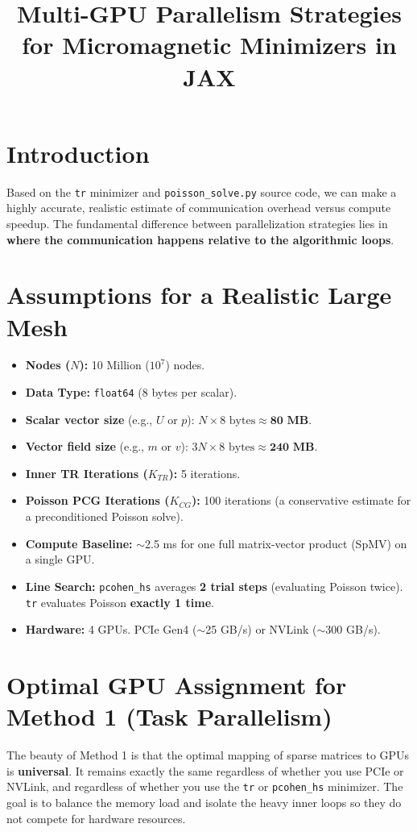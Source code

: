 \documentclass[12pt,a4paper]{article}
\title{Multi-GPU Parallelism Strategies for Micromagnetic Minimizers in JAX}
\author{}
\date{}
\begin{document}
\maketitle

\section{Introduction}
Based on the \texttt{tr} minimizer and \texttt{poisson\_solve.py} source code, we can make a highly accurate, realistic estimate of communication overhead versus compute speedup. The fundamental difference between parallelization strategies lies in \textbf{where the communication happens relative to the algorithmic loops}.

\section{Assumptions for a Realistic Large Mesh}
\begin{itemize}
    \item \textbf{Nodes ($N$):} 10 Million ($10^7$) nodes.
    \item \textbf{Data Type:} \texttt{float64} (8 bytes per scalar).
    \item \textbf{Scalar vector size} (e.g., $U$ or $p$): $N \times 8 \text{ bytes} \approx \textbf{80 MB}$.
    \item \textbf{Vector field size} (e.g., $m$ or $v$): $3N \times 8 \text{ bytes} \approx \textbf{240 MB}$.
    \item \textbf{Inner TR Iterations ($K_{TR}$):} 5 iterations.
    \item \textbf{Poisson PCG Iterations ($K_{CG}$):} 100 iterations (a conservative estimate for a preconditioned Poisson solve).
    \item \textbf{Compute Baseline:} $\sim$2.5 ms for one full matrix-vector product (SpMV) on a single GPU.
    \item \textbf{Line Search:} \texttt{pcohen\_hs} averages \textbf{2 trial steps} (evaluating Poisson twice). \texttt{tr} evaluates Poisson \textbf{exactly 1 time}.
    \item \textbf{Hardware:} 4 GPUs. PCIe Gen4 ($\sim$25 GB/s) or NVLink ($\sim$300 GB/s).
\end{itemize}

\section{Optimal GPU Assignment for Method 1 (Task Parallelism)}
The beauty of Method 1 is that the optimal mapping of sparse matrices to GPUs is \textbf{universal}. It remains exactly the same regardless of whether you use PCIe or NVLink, and regardless of whether you use the \texttt{tr} or \texttt{pcohen\_hs} minimizer. The goal is to balance the memory load and isolate the heavy inner loops so they do not compete for hardware resources.
\end{document}
